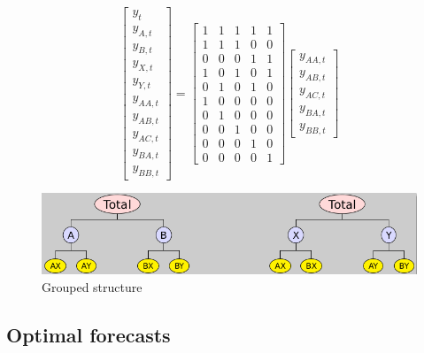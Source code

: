 \documentclass[c, dvipsnames]{beamer}  %
\begin{document}
\begin{frame}[shrink=5]
\frametitle{\insertsection} 
\framesubtitle{\insertsubsection}




\[\begin{bmatrix}
y_{t} \\
y_{A, t} \\
y_{B, t} \\
y_{X, t} \\
y_{Y, t} \\
y_{AA, t} \\
y_{AB, t} \\
y_{AC, t} \\
y_{BA, t} \\
y_{BB, t}
\end{bmatrix}
=
\begin{bmatrix}
1 & 1 & 1 & 1 & 1 \\
1 & 1 & 1 & 0 & 0 \\
0 & 0 & 0 & 1 & 1 \\
1 & 0 & 1 & 0 & 1 \\
0 & 1 & 0 & 1 & 0 \\
1  & 0  & 0  & 0  & 0  \\
0  & 1  & 0  & 0  & 0  \\
0  & 0  & 1  & 0  & 0  \\
0  & 0  & 0  & 1  & 0  \\
0  & 0  & 0  & 0  & 1
\end{bmatrix}
\begin{bmatrix}
y_{AA, t} \\
y_{AB, t} \\
y_{AC, t} \\
y_{BA, t} \\
y_{BB, t}
\end{bmatrix}\]


\begin{figure}
	\centering
	\includegraphics[width=0.7\linewidth]{screenshot011}
	\caption{Grouped structure}
	\label{fig:screenshot011}
\end{figure}


\end{frame}





\subsection{Optimal forecasts}
\end{document}

